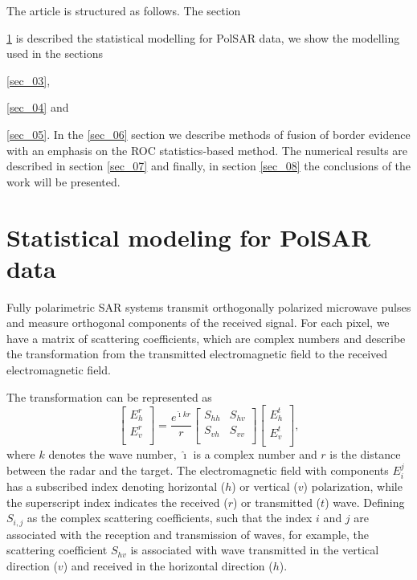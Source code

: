 \documentclass[conference]{IEEEtran}
\begin{document}
The article is structured as follows. The section {\ref{sec_02} is described the statistical modelling for PolSAR data, we show the modelling used in the sections {\ref{sec_03}, {\ref{sec_04} and {\ref{sec_05}. In the \ref{sec_06} section we describe methods of fusion of border evidence with an emphasis on the ROC statistics-based method. The numerical results are described in section \ref{sec_07} and finally, in section \ref{sec_08} the conclusions of the work will be presented. 

\section{Statistical modeling for PolSAR data}\label{sec_02}
Fully polarimetric SAR systems transmit orthogonally polarized microwave pulses and measure orthogonal components of the received signal. For each pixel, we have a matrix of scattering coefficients, which are complex numbers and describe the transformation from the transmitted electromagnetic field to the received electromagnetic field.

The transformation can be represented as
\begin{equation*}
 \left[
\begin{array}{c}
	E_{h}^{r}   \\
	E_{v}^{r}    \\
\end{array}
\right]
 = \frac{e^{\hat{\imath} kr}}{r}\left[
\begin{array}{cc}
	S_{hh}   & S_{hv}   \\
	S_{vh}   & S_{vv}   \\
\end{array}
\right]
 \left[
\begin{array}{c}
	E_{h}^{t}   \\
	E_{v}^{t}    \\
\end{array}
\right],
\end{equation*}
where $k$ denotes the wave number, $\hat{\imath}$ is a complex number and $r$ is the distance between the radar and the target. The electromagnetic field with components $E_{i}^{j}$ has a subscribed index denoting horizontal ($h$) or vertical ($v$) polarization, while the superscript index indicates the received ($r$) or transmitted ($t$) wave. Defining $S_{i,j}$ as the complex scattering coefficients, such that the index $i$ and $j$ are associated with the reception and transmission of waves, for example, the scattering coefficient $S_{hv}$ is associated with wave transmitted in the vertical direction ($v$) and received in the horizontal direction ($h$).

}}}}
\end{document}
